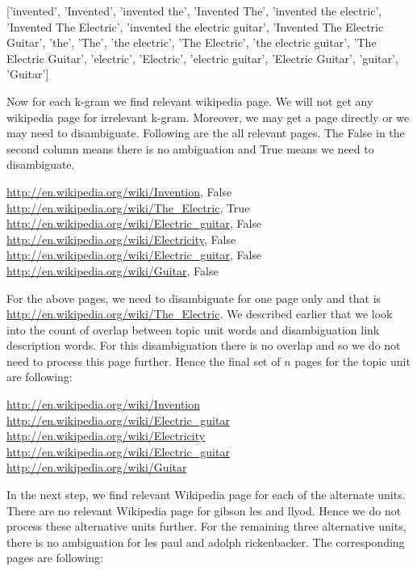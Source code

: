 \documentclass[12pt]{article}
\begin{document}
['invented', 'Invented', 'invented the', 'Invented The', 'invented the electric', 'Invented The Electric', 'invented the electric guitar', 'Invented The Electric Guitar', 'the', 'The', 'the electric', 'The Electric', 'the electric guitar', 'The Electric Guitar', 'electric', 'Electric', 'electric guitar', 'Electric Guitar', 'guitar', 'Guitar'] 

Now for each k-gram we find relevant wikipedia page. We will not get any wikipedia page for irrelevant k-gram.  Moreover, we may get a page directly or we may need to disambiguate. Following are the all relevant pages. The False in the second column means there is no ambiguation and True means we need to disambiguate.

\url{http://en.wikipedia.org/wiki/Invention}, False\\
\url{http://en.wikipedia.org/wiki/The_Electric}, True \\
\url{http://en.wikipedia.org/wiki/Electric_guitar}, False\\
\url{http://en.wikipedia.org/wiki/Electricity}, False \\
\url{http://en.wikipedia.org/wiki/Electric_guitar}, False \\
\url{http://en.wikipedia.org/wiki/Guitar}, False

For the above pages, we need to disambiguate for one page only and that is \url{http://en.wikipedia.org/wiki/The_Electric}. We described earlier that we look into the count of overlap between topic unit words and disambiguation link description words. For this disambiguation there is no overlap and so we do not need to process this page further. Hence the final set of $n$ pages for the topic unit are following:

\url{http://en.wikipedia.org/wiki/Invention} \\
\url{http://en.wikipedia.org/wiki/Electric_guitar} \\
\url{http://en.wikipedia.org/wiki/Electricity} \\
\url{http://en.wikipedia.org/wiki/Electric_guitar} \\
\url{http://en.wikipedia.org/wiki/Guitar}

In the next step, we find relevant Wikipedia page for each of the alternate units. There are no relevant Wikipedia page for  gibson les and llyod. Hence we do not process these alternative units further. For the remaining three alternative units, there is no ambiguation for les paul and adolph rickenbacker. The corresponding pages are following:
\end{document}
